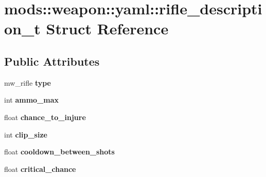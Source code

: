 \hypertarget{structmods_1_1weapon_1_1yaml_1_1rifle__description__t}{}\section{mods\+:\+:weapon\+:\+:yaml\+:\+:rifle\+\_\+description\+\_\+t Struct Reference}
\label{structmods_1_1weapon_1_1yaml_1_1rifle__description__t}
\subsection*{Public Attributes}
\begin{DoxyCompactItemize}
\item 
\mbox{\label{structmods_1_1weapon_1_1yaml_1_1rifle__description__t_a7d8549f3d9b4f51d4938ccb065024fa2}} 
mw\+\_\+rifle {\bfseries type}
\item 
\mbox{\label{structmods_1_1weapon_1_1yaml_1_1rifle__description__t_a0fa4e93f97883cd34ac6909e087a769f}} 
int {\bfseries ammo\+\_\+max}
\item 
\mbox{\label{structmods_1_1weapon_1_1yaml_1_1rifle__description__t_ad6e846e6b13df0d97ca1cec85ced89f4}} 
float {\bfseries chance\+\_\+to\+\_\+injure}
\item 
\mbox{\label{structmods_1_1weapon_1_1yaml_1_1rifle__description__t_ae2cab7af826dc3c788ab40b7ee957e20}} 
int {\bfseries clip\+\_\+size}
\item 
\mbox{\label{structmods_1_1weapon_1_1yaml_1_1rifle__description__t_a00e5b281299e046ee9b9c79281b3640d}} 
float {\bfseries cooldown\+\_\+between\+\_\+shots}
\item 
\mbox{\label{structmods_1_1weapon_1_1yaml_1_1rifle__description__t_a8afa3e0d8bbbc0dbbf9e990d7f54abf3}} 
float {\bfseries critical\+\_\+chance}
\item 
\mbox{\label{structmods_1_1weapon_1_1yaml_1_1rifle__description__t_a96e78d3f8341998df90ca008a2b47de9}} 

\end{DoxyCompactItemize}
